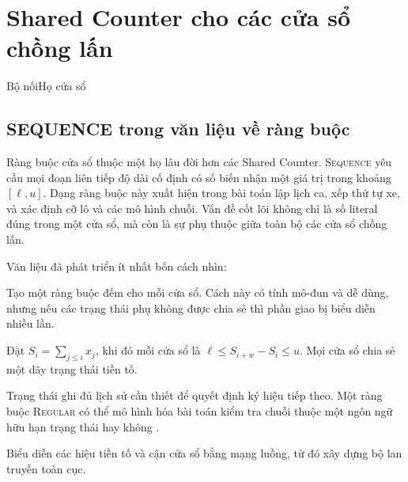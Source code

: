\chapter{Shared Counter cho các cửa sổ chồng lấn}


  {Bộ nối}{Họ cửa sổ}

\section{SEQUENCE trong văn liệu về ràng buộc}

Ràng buộc cửa sổ thuộc một họ lâu đời hơn các Shared Counter.
\textsc{Sequence}
yêu cầu mọi đoạn liên tiếp độ dài cố định có số biến nhận một giá trị trong
khoảng \([\ell,u]\). Dạng ràng buộc này xuất hiện trong bài toán lập lịch ca, xếp thứ tự xe, và xác định
cỡ lô và các mô hình chuỗi. Vấn đề cốt lõi không chỉ là số literal đúng trong
một cửa sổ, mà còn là sự phụ thuộc giữa toàn bộ các cửa sổ chồng lấn.

Văn liệu đã phát triển ít nhất bốn cách nhìn:
\begin{description}[style=nextline]
  \item[Phân rã theo cửa sổ]
  Tạo một ràng buộc đếm cho mỗi cửa sổ. Cách này có tính mô-đun và dễ dùng,
  nhưng nếu các trạng thái phụ không được chia sẻ thì phần giao bị biểu diễn
  nhiều lần.

  \item[Tổng tiền tố]
  Đặt \(S_i=\sum_{j\le i}x_j\), khi đó mỗi cửa sổ là
  \(\ell\le S_{i+w}-S_i\le u\). Mọi cửa sổ chia sẻ một dãy trạng thái tiền tố.

  \item[Ôtômát/ràng buộc chính quy]
  Trạng thái ghi đủ lịch sử cần thiết để quyết định ký hiệu tiếp theo. Một
  ràng buộc \textsc{Regular} có thể mô hình hóa bài toán kiểm tra chuỗi thuộc một ngôn ngữ
  hữu hạn trạng thái hay không \parencite{pesant2004regular}.

  \item[Luồng hoặc đồ thị]
  Biểu diễn các hiệu tiền tố và cận cửa sổ bằng mạng luồng, từ đó xây dựng
  bộ lan truyền toàn cục.
\end{description}

